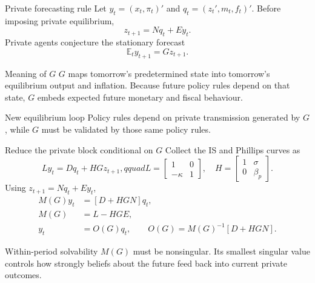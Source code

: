 \documentclass[10pt,aspectratio=169]{beamer}
\newcommand{\E}{\mathbb{E}}
\begin{document}
\begin{frame}{Private forecasting rule}
Let $y_t=(x_t,\pi_t)'$ and $q_t=(z_t',m_t,f_t)'$. Before imposing private
equilibrium,
\begin{equation*}
z_{t+1}=Nq_t+Ey_t.
\end{equation*}
Private agents conjecture the stationary forecast
\begin{equation*}
\boxed{\E_ty_{t+1}=Gz_{t+1}.}
\end{equation*}
\begin{block}{Meaning of $G$}
$G$ maps tomorrow's predetermined state into tomorrow's equilibrium output and
inflation. Because future policy rules depend on that state, $G$ embeds expected
future monetary and fiscal behaviour.
\end{block}
\begin{alertblock}{New equilibrium loop}
Policy rules depend on private transmission generated by $G$, while $G$ must be
validated by those same policy rules.
\end{alertblock}
\end{frame}

\begin{frame}{Reduce the private block conditional on $G$}
Collect the IS and Phillips curves as
\begin{equation*}
Ly_t=Dq_t+HGz_{t+1},qquad
L=\begin{bmatrix}1&0\\-\kappa&1\end{bmatrix},\quad
H=\begin{bmatrix}1&\sigma\\0&\beta_p\end{bmatrix}.
\end{equation*}
Using $z_{t+1}=Nq_t+Ey_t$,
\begin{align*}
M(G)y_t&=[D+HGN]q_t,\\
M(G)&=L-HGE,\\
y_t&=O(G)q_t,\qquad O(G)=M(G)^{-1}[D+HGN].
\end{align*}
\begin{alertblock}{Within-period solvability}
$M(G)$ must be nonsingular. Its smallest singular value controls how strongly
beliefs about the future feed back into current private outcomes.
\end{alertblock}
\end{frame}
\end{document}
